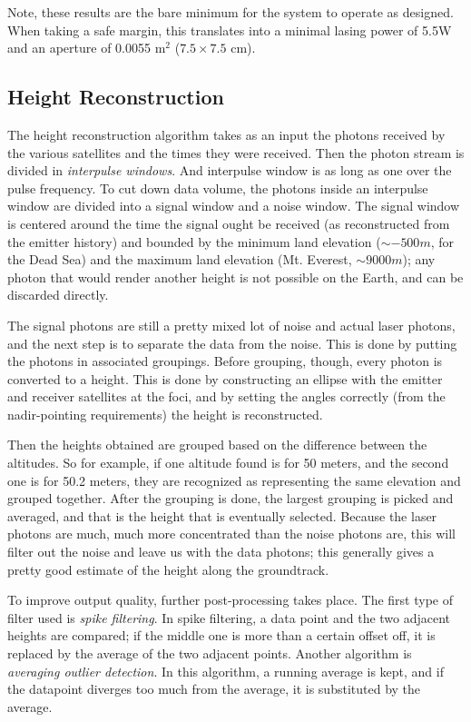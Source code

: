 Note, these results are the bare minimum for the system to operate as designed. When taking a safe margin, this translates into a minimal lasing power of 5.5W and an aperture of 0.0055 m$^2$ ($7.5\times7.5$ cm). 

\subsection{Height Reconstruction}
\label{sec:HeightReconstruction}

The height reconstruction algorithm takes as an input the photons received by the various satellites and the times they were received. Then the photon stream is divided in \emph{interpulse windows}. And interpulse window is as long as one over the pulse frequency. To cut down data volume, the photons inside an interpulse window are divided into a signal window and a noise window. The signal window is centered around the time the signal ought be received (as reconstructed from the emitter history) and bounded by the minimum land elevation ($\sim -500 m$, for the Dead Sea) and the maximum land elevation (Mt. Everest, $\sim 9000 m$); any photon that would render another height is not possible on the Earth, and can be discarded directly.

The signal photons are still a pretty mixed lot of noise and actual laser photons, and the next step is to separate the data from the noise. This is done by putting the photons in associated groupings. Before grouping, though, every photon is converted to a height. This is done by constructing an ellipse with the emitter and receiver satellites at the foci, and by setting the angles correctly (from the nadir-pointing requirements) the height is reconstructed.

Then the heights obtained are grouped based on the difference between the altitudes. So for example, if one altitude found is for 50 meters, and the second one is for 50.2 meters, they are recognized as representing the same elevation and grouped together. After the grouping is done, the largest grouping is picked and averaged, and that is the height that is eventually selected. Because the laser photons are much, much more concentrated than the noise photons are, this will filter out the noise and leave us with the data photons; this generally gives a pretty good estimate of the height along the groundtrack.

To improve output quality, further post-processing takes place. The first type of filter used is \emph{spike filtering}. In spike filtering, a data point and the two adjacent heights are compared; if the middle one is more than a certain offset off, it is replaced by the average of the two adjacent points. Another algorithm is \emph{averaging outlier detection}. In this algorithm, a running average is kept, and if the datapoint diverges too much from the average, it is substituted by the average.

